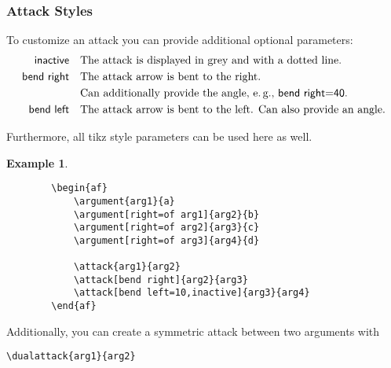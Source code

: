 \documentclass{article}
\newtheorem{example}{Example}
\begin{document}
\subsubsection{Attack Styles}
    To customize an attack you can provide additional optional parameters:
    \begin{align*}
        \mathsf{inactive} &\quad \text{The attack is displayed in grey and with a dotted line.}\\
        \mathsf{bend~right} &\quad \text{The attack arrow is bent to the right.}\\
        &\quad \text{Can additionally provide the angle, e.\,g., \textsf{bend~right=40}.}\\
        \mathsf{bend~left} &\quad \text{The attack arrow is bent to the left. Can also provide an angle.}\\
    \end{align*}
    
    Furthermore, all \textsf{tikz} style parameters can be used here as well.

    \begin{example}~
    \begin{verbatim}
        \begin{af}
            \argument{arg1}{a}
            \argument[right=of arg1]{arg2}{b}
            \argument[right=of arg2]{arg3}{c}
            \argument[right=of arg3]{arg4}{d}
    
            \attack{arg1}{arg2}
            \attack[bend right]{arg2}{arg3}
            \attack[bend left=10,inactive]{arg3}{arg4}
        \end{af}    
    \end{verbatim}

    \begin{center}
        \begin{af}
    
        \end{af}
    \end{center}
    \end{example}
    

    Additionally, you can create a symmetric attack between two arguments with

    \verb|\dualattack{arg1}{arg2}|
\end{document}
